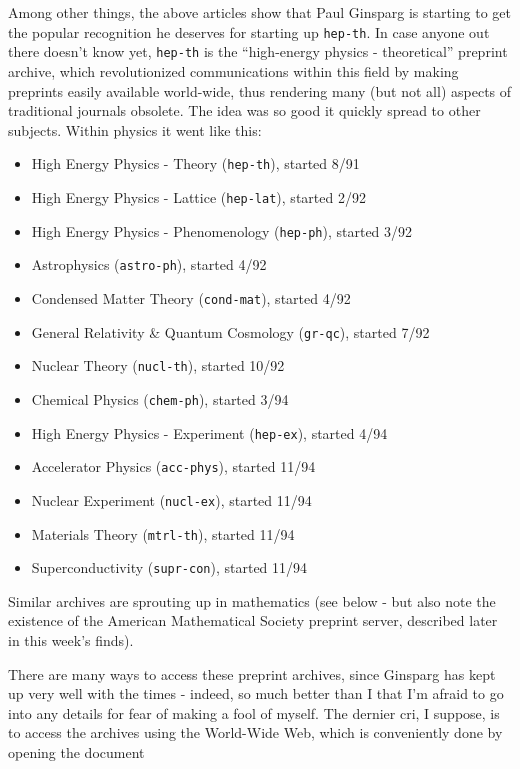 \documentclass{article}
\def\tightlist{}
\begin{document}
Among other things, the above articles show that Paul Ginsparg is
starting to get the popular recognition he deserves for starting up
\texttt{hep-th}. In case anyone out there doesn't know yet,
\texttt{hep-th} is the ``high-energy physics - theoretical'' preprint
archive, which revolutionized communications within this field by making
preprints easily available world-wide, thus rendering many (but not all)
aspects of traditional journals obsolete. The idea was so good it
quickly spread to other subjects. Within physics it went like this:

\begin{itemize}
\tightlist
\item
  High Energy Physics - Theory (\texttt{hep-th}), started 8/91
\item
  High Energy Physics - Lattice (\texttt{hep-lat}), started 2/92
\item
  High Energy Physics - Phenomenology (\texttt{hep-ph}), started 3/92
\item
  Astrophysics (\texttt{astro-ph}), started 4/92
\item
  Condensed Matter Theory (\texttt{cond-mat}), started 4/92
\item
  General Relativity \& Quantum Cosmology (\texttt{gr-qc}), started 7/92
\item
  Nuclear Theory (\texttt{nucl-th}), started 10/92
\item
  Chemical Physics (\texttt{chem-ph}), started 3/94
\item
  High Energy Physics - Experiment (\texttt{hep-ex}), started 4/94
\item
  Accelerator Physics (\texttt{acc-phys}), started 11/94
\item
  Nuclear Experiment (\texttt{nucl-ex}), started 11/94
\item
  Materials Theory (\texttt{mtrl-th}), started 11/94
\item
  Superconductivity (\texttt{supr-con}), started 11/94
\end{itemize}

Similar archives are sprouting up in mathematics (see below - but also
note the existence of the American Mathematical Society preprint server,
described later in this week's finds).

There are many ways to access these preprint archives, since Ginsparg
has kept up very well with the times - indeed, so much better than I
that I'm afraid to go into any details for fear of making a fool of
myself. The dernier cri, I suppose, is to access the archives using the
World-Wide Web, which is conveniently done by opening the document
\end{document}
